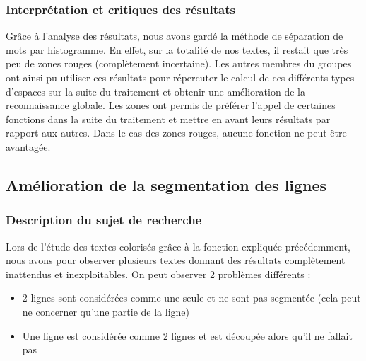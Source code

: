 \documentclass[12pt,a4paper]{article}
\begin{document}
\subsubsection{Interprétation et critiques des résultats}
Grâce à l'analyse des résultats, nous avons gardé la méthode de séparation de mots par histogramme. En effet, sur la totalité de nos textes, il restait que très peu de zones rouges (complètement incertaine). Les autres membres du groupes ont ainsi pu utiliser ces résultats pour répercuter le calcul de ces différents types d'espaces sur la suite du traitement et obtenir une amélioration de la reconnaissance globale. Les zones ont permis de préférer l'appel de certaines fonctions dans la suite du traitement et mettre en avant leurs résultats par rapport aux autres. Dans le cas des zones rouges, aucune fonction ne peut être avantagée.

\newpage
\subsection{Amélioration de la segmentation des lignes}
\subsubsection{Description du sujet de recherche}
Lors de l’étude des textes colorisés grâce à la fonction expliquée précédemment, nous avons pour observer plusieurs textes donnant des résultats complètement inattendus et inexploitables. On peut observer 2 problèmes différents :

\begin{itemize}
    \item 2 lignes sont considérées comme une seule et ne sont pas segmentée (cela peut ne concerner qu’une partie de la ligne)
    \item Une ligne est considérée comme 2 lignes et est découpée alors qu’il ne fallait pas
\end{itemize}
\end{document}
